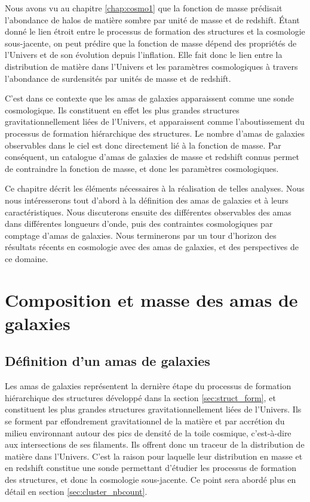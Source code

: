 Nous avons vu au chapitre \ref{chap:cosmo1} que la fonction de masse prédisait l'abondance de halos de matière sombre par unité de masse et de redshift.
Étant donné le lien étroit entre le processus de formation des structures et la cosmologie sous-jacente, on peut prédire que la fonction de masse dépend des propriétés de l'Univers et de son évolution depuis l'inflation.
Elle fait donc le lien entre la distribution de matière dans l'Univers et les paramètres cosmologiques à travers l'abondance de surdensités par unités de masse et de redshift.

C'est dans ce contexte que les amas de galaxies apparaissent comme une sonde cosmologique.
Ils constituent en effet les plus grandes structures gravitationnellement liées de l'Univers, et apparaissent comme l'aboutissement du processus de formation hiérarchique des structures.
Le nombre d'amas de galaxies observables dans le ciel est donc directement lié à la fonction de masse.
Par conséquent, un catalogue d'amas de galaxies de masse et redshift connus permet de   contraindre la fonction de masse, et donc les paramètres cosmologiques.

Ce chapitre décrit les éléments nécessaires à la réalisation de telles analyses.
Nous nous intéresserons tout d'abord à la définition des amas de galaxies et à leurs caractéristiques.
Nous discuterons ensuite des différentes observables des amas dans différentes longueurs d'onde, puis des contraintes cosmologiques par comptage d'amas de galaxies.
Nous terminerons par un tour d'horizon des résultats récents en cosmologie avec des amas de galaxies, et des perspectives de ce domaine.

\section{Composition et masse des amas de galaxies}

\subsection{Définition d'un amas de galaxies}

Les amas de galaxies représentent la dernière étape du processus de formation hiérarchique des structures développé dans la section \ref{sec:struct_form}, et constituent les plus grandes structures gravitationnellement liées de l'Univers.
Ils se forment par effondrement gravitationnel de la matière et par accrétion du milieu environnant autour des pics de densité de la toile cosmique, c'est-à-dire aux intersections de ses filaments.
Ils offrent donc un traceur de la distribution de matière dans l'Univers.
C'est la raison pour laquelle leur distribution en masse et en redshift constitue une sonde permettant d'étudier les processus de formation des structures, et donc la cosmologie sous-jacente.
Ce point sera abordé plus en détail en section \ref{sec:cluster_nbcount}.

